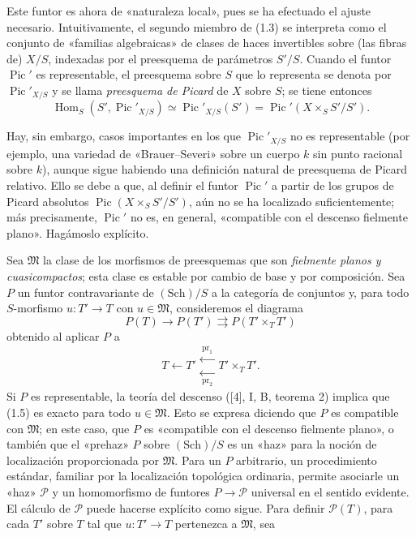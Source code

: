 Este funtor es ahora de «naturaleza local», pues se ha efectuado el ajuste
necesario. Intuitivamente, el segundo miembro de (1.3) se interpreta como el
conjunto de «familias algebraicas» de clases de haces invertibles sobre (las
fibras de) $X/S$, indexadas por el preesquema de parámetros $S'/S$. Cuando el
funtor $\operatorname{Pic}'$ es representable, el preesquema sobre $S$ que lo
representa se denota por $\operatorname{Pic}'_{X/S}$ y se llama
\emph{preesquema de Picard} de $X$ sobre $S$; se tiene entonces
\begin{equation}
\operatorname{Hom}_S(S',\operatorname{Pic}'_{X/S})
\simeq\operatorname{Pic}'_{X/S}(S')
=\operatorname{Pic}'(X\times_SS'/S').
\tag{1.4}
\end{equation}

Hay, sin embargo, casos importantes en los que $\operatorname{Pic}'_{X/S}$ no
es representable (por ejemplo, una variedad de «Brauer--Severi» sobre un
cuerpo $k$ sin punto racional sobre $k$), aunque sigue habiendo una definición
natural de preesquema de Picard relativo. Ello se debe a que, al definir el
funtor $\operatorname{Pic}'$ a partir de los grupos de Picard absolutos
$\operatorname{Pic}(X\times_SS'/S')$, aún no se ha localizado suficientemente;
más precisamente, $\operatorname{Pic}'$ no es, en general, «compatible con el
descenso fielmente plano». Hagámoslo explícito.

Sea $\mathfrak M$ la clase de los morfismos de preesquemas que son
\emph{fielmente planos y cuasicompactos}; esta clase es estable por cambio de
base y por composición. Sea $P$ un funtor contravariante de $(\mathrm{Sch})/S$
a la categoría de conjuntos y, para todo $S$-morfismo
$u:T'\longrightarrow T$ con $u\in\mathfrak M$, consideremos el diagrama
\begin{equation}
P(T)\longrightarrow P(T')\rightrightarrows P(T'\times_TT')
\tag{1.5}
\end{equation}
obtenido al aplicar $P$ a
\[
T\longleftarrow T'\mathrel{\substack{\xleftarrow{\,\mathrm{pr}_1\,}\\[-0.35ex]
\xleftarrow[\,\mathrm{pr}_2\,]{}}}T'\times_TT'.
\]
Si $P$ es representable, la teoría del descenso ([4], I, B, teorema 2) implica
que (1.5) es exacto para todo $u\in\mathfrak M$. Esto se expresa diciendo que
$P$ es compatible con $\mathfrak M$; en este caso, que $P$ es «compatible con
el descenso fielmente plano», o también que el «prehaz» $P$ sobre
$(\mathrm{Sch})/S$ es un «haz» para la noción de localización proporcionada
por $\mathfrak M$. Para un $P$ arbitrario, un procedimiento estándar, familiar
por la localización topológica ordinaria, permite asociarle un «haz»
$\mathcal P$ y un homomorfismo de funtores $P\longrightarrow\mathcal P$
universal en el sentido evidente. El cálculo de $\mathcal P$ puede hacerse
explícito como sigue. Para definir $\mathcal P(T)$, para cada $T'$ sobre $T$
tal que $u:T'\longrightarrow T$ pertenezca a $\mathfrak M$, sea

